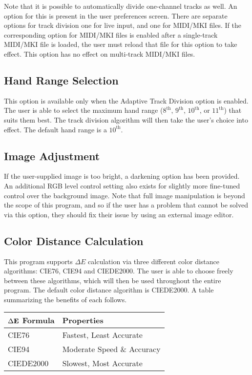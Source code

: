 \documentclass[english]{article}
\makeatletter
\newenvironment{restoretext}%
    {\@parboxrestore%
     \begin{adjustwidth}{}{\leftmargin}%
    }{\end{adjustwidth}
     }
\def\rcbegin{\begin{restoretext}\centering}
\def\rcend{\end{restoretext}}
\makeatother
\begin{document}
Note that it is possible to automatically divide one-channel tracks as well. An option for this is present in the user
preferences screen. There are separate options for track division \textendash{} one for live input, and one for MIDI/MKI files.
If the corresponding option for MIDI/MKI files is enabled after a single-track MIDI/MKI file is loaded, the user must reload
that file for this option to take effect. This option has no effect on multi-track MIDI/MKI files.

\subsection{Hand Range Selection}

This option is available only when the Adaptive Track Division option is enabled. The user is able to select the 
maximum hand range ($8^\text{th}$, $9^\text{th}$, $10^\text{th}$, or $11^\text{th}$) that suits them best. The 
track division algorithm will then take the user's choice into effect. The default hand range is a $10^\text{th}$.

\subsection{Image Adjustment}

If the user-supplied image is too bright, a darkening option has been provided. An additional RGB level control setting also exists for slightly more fine-tuned control over the background image. Note that full image
manipulation is beyond the scope of this program, and so if the user has a problem that cannot be solved 
via this option, they should fix their issue by using an external image editor.

\subsection{Color Distance Calculation}

This program supports $\Delta E$ calculation via three different color distance algorithms: CIE76, CIE94 and CIEDE2000.
The user is able to choose freely between these algorithms, which will then be used throughout the entire program. The
default color distance algorithm is CIEDE2000. A table summarizing the benefits of each follows.

\vspace{1em}

\rcbegin
\begin{tabular}{|l|l|}
  \hline
  $\Delta\bf{E}$\textbf{ Formula}   & \textbf{Properties} \\
  \hline
  CIE76                             & Fastest, Least Accurate\\
  CIE94                             & Moderate Speed \& Accuracy\\
  CIEDE2000                         & Slowest, Most Accurate\\
  \hline
\end{tabular}
\rcend
\end{document}
